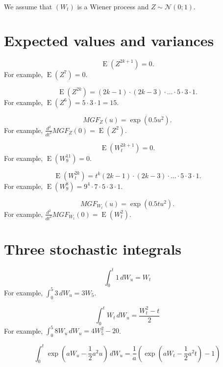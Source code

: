 \documentclass[12pt]{article} %
\theoremstyle{definition} %
\DeclareMathOperator{\E}{E}
\newcommand \cN{\mathcal{N}}
\begin{document}
We assume that $(W_t)$ is a Wiener process and $Z\sim \cN(0;1)$.


\section*{Expected values and variances}

\[
\E(Z^{2k+1}) = 0.
\]
For example, $\E(Z^7) = 0$.


\[
\E(Z^{2k}) = (2k-1) \cdot (2k-3) \cdot \ldots \cdot 5 \cdot 3 \cdot 1.    
\]
For example, $\E(Z^6) = 5 \cdot 3 \cdot 1 = 15$.

\[
MGF_Z(u) =  \exp(0.5 u^2).
\]
For example, $\frac{d^2}{dt^2} MGF_Z(0) = \E(Z^2)$. 


\[
\E(W_t^{2k+1}) = 0.
\]
For example, $\E(W_9^{11}) = 0$.


\[
\E(W_t^{2k}) = t^k (2k-1) \cdot (2k-3) \cdot \ldots \cdot 5 \cdot 3 \cdot 1.    
\]
For example, $\E(W_9^8) = 9^4 \cdot 7\cdot  5 \cdot 3 \cdot 1$.


\[
MGF_{W_t}(u) = \exp(0.5 t u^2).
\]
For example, $\frac{d^2}{dt^2} MGF_{W_t}(0) = \E(W_t^2)$. 


\section*{Three stochastic integrals}

\[
    \int_0^t 1 \, dW_u = W_t
\]
For example, $\int_0^5 3 \, dW_u = 3 W_5$.

\[
    \int_0^t W_t \, dW_u = \frac{W_t^2 - t}{2}
\]
For example, $\int_0^5 8 W_u \, dW_u = 4 W_5^2 - 20$.

\[
    \int_0^t \exp(aW_u -\frac{1}{2} a^2 u) \, dW_u = \frac{1}{a}\left(\exp(aW_t - \frac{1}{2}a^2 t) - 1\right) 
\]
\end{document}
